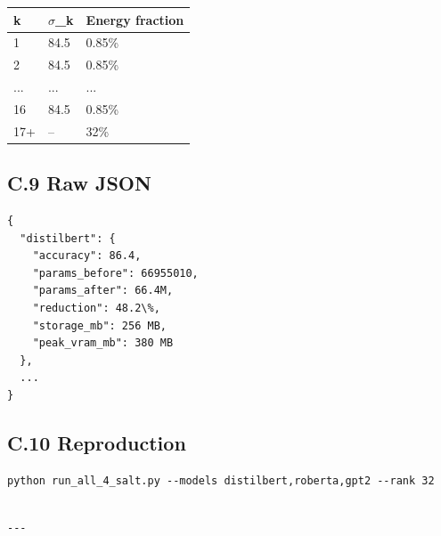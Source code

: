 \begin{table}[H]
\centering
\small
\begin{tabular}{lll}
\toprule
\textbf{k} & \textbf{$\sigma$\_k} & \textbf{Energy fraction} \\
\midrule
1 & 84.5 & 0.85\% \\
2 & 84.5 & 0.85\% \\
... & ... & ... \\
16 & 84.5 & 0.85\% \\
17+ & -- & 32\% \\
\bottomrule
\end{tabular}
\end{table}

\subsection{C.9 Raw JSON}

\begin{lstlisting}
{
  "distilbert": {
    "accuracy": 86.4,
    "params_before": 66955010,
    "params_after": 66.4M,
    "reduction": 48.2\%,
    "storage_mb": 256 MB,
    "peak_vram_mb": 380 MB
  },
  ...
}
\end{lstlisting}

\subsection{C.10 Reproduction}

\begin{lstlisting}
python run_all_4_salt.py --models distilbert,roberta,gpt2 --rank 32
\end{lstlisting}
\begin{lstlisting}

---
\end{lstlisting}